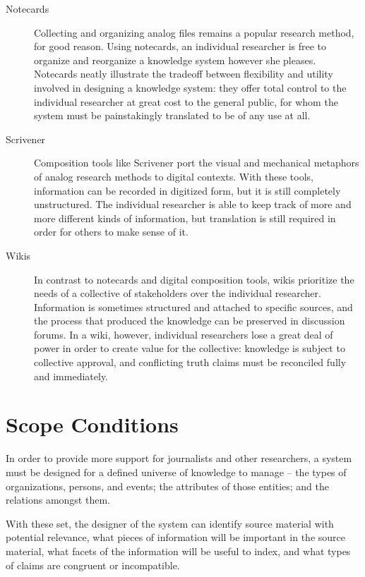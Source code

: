 \documentclass[format=siggraph, review=true]{acmart}
\begin{document}
\begin{description}
  \item [Notecards] Collecting and organizing analog files remains
    a popular research method, for good reason. Using notecards, an
    individual researcher is free to organize and reorganize a
    knowledge system however she pleases. Notecards neatly illustrate
    the tradeoff between flexibility and utility involved in designing
    a knowledge system: they offer total control to the individual
    researcher at great cost to the general public, for whom the system
    must be painstakingly translated to be of any use at all.

  \item [Scrivener] Composition tools like Scrivener port the visual
    and mechanical metaphors of analog research methods to digital
    contexts. With these tools, information can be recorded in digitized
    form, but it is still completely unstructured. The individual
    researcher is able to keep track of more and more different kinds
    of information, but translation is still required in order for others
    to make sense of it.\cite{scrivener}

  \item [Wikis] In contrast to notecards and digital composition tools,
    wikis prioritize the needs of a collective of stakeholders over the
    individual researcher. Information is sometimes structured and
    attached to specific sources, and the process that produced the
    knowledge can be preserved in discussion forums. In a wiki, however,
    individual researchers lose a great deal of power in order to create
    value for the collective: knowledge is subject to collective approval,
    and conflicting truth claims must be reconciled fully and immediately.
\end{description}

\section{Scope Conditions}
In order to provide more support for journalists and other
researchers, a system must be designed for a defined universe of
knowledge to manage -- the types of organizations, persons, and
events; the attributes of those entities; and the relations amongst
them.

With these set, the designer of the system can identify source
material with potential relevance, what pieces of information
will be important in the source material, what facets of the
information will be useful to index, and what types of claims are
congruent or incompatible.
\end{document}
